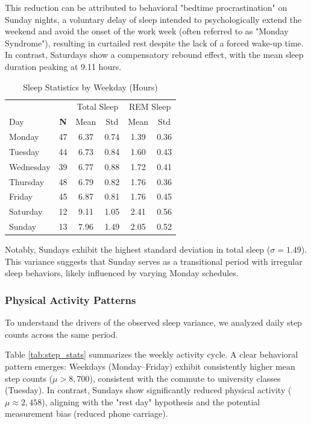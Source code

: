 \documentclass[conference]{IEEEtran}
\begin{document}
This reduction can be attributed to behavioral "bedtime procrastination" on Sunday nights, a voluntary delay of sleep intended to psychologically extend the weekend and avoid the onset of the work week (often referred to as "Monday Syndrome"), resulting in curtailed rest despite the lack of a forced wake-up time. In contrast, Saturdays show a compensatory rebound effect, with the mean sleep duration peaking at 9.11 hours.

\begin{table}[h]
\centering
\caption{Sleep Statistics by Weekday (Hours)}
\label{tab:weekday_stats}
\begin{tabular}{@{}lccccc@{}}
\toprule
 & & \multicolumn{2}{c}{Total Sleep} & \multicolumn{2}{c}{REM Sleep} \\
Day & \textbf{N} & Mean & Std & Mean & Std \\ \midrule
Monday    & 47 & 6.37 & 0.74 & 1.39 & 0.36 \\
Tuesday   & 44 & 6.73 & 0.84 & 1.60 & 0.43 \\
Wednesday & 39 & 6.77 & 0.88 & 1.72 & 0.41 \\
Thursday  & 48 & 6.79 & 0.82 & 1.76 & 0.36 \\
Friday    & 45 & 6.87 & 0.81 & 1.76 & 0.45 \\
Saturday  & 12 & 9.11 & 1.05 & 2.41 & 0.56 \\
Sunday    & 13 & 7.96 & 1.49 & 2.05 & 0.52 \\ \bottomrule
\end{tabular}
\end{table}

Notably, Sundays exhibit the highest standard deviation in total sleep ($\sigma = 1.49$). This variance suggests that Sunday serves as a transitional period with irregular sleep behaviors, likely influenced by varying Monday schedules.

\subsubsection{Physical Activity Patterns}
To understand the drivers of the observed sleep variance, we analyzed daily step counts across the same period.

Table \ref{tab:step_stats} summarizes the weekly activity cycle. A clear behavioral pattern emerges: Weekdays (Monday--Friday) exhibit consistently higher mean step counts ($\mu > 8,700$), consistent with the commute to university classes (Tuesday). In contrast, Sundays show significantly reduced physical activity ($\mu \approx 2,458$), aligning with the "rest day" hypothesis and the potential measurement bias (reduced phone carriage).
\end{document}
